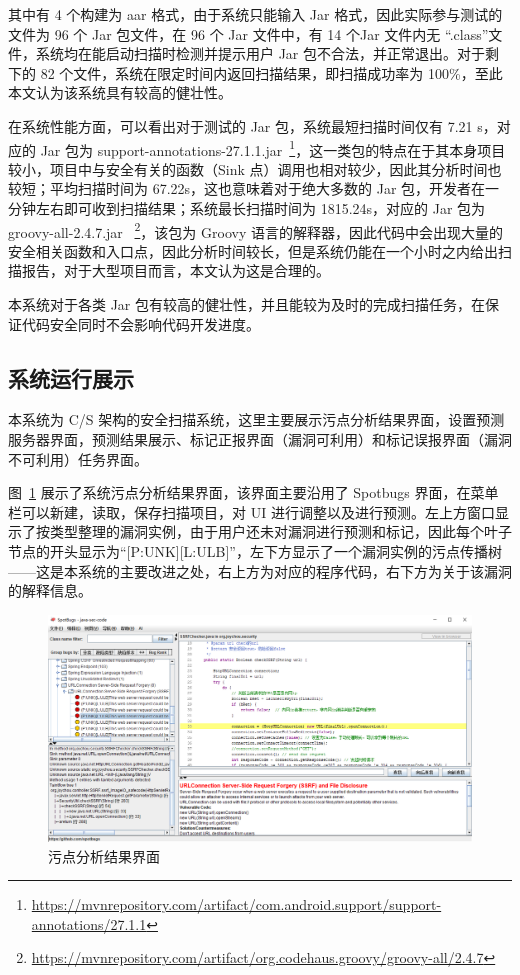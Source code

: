 其中有 4 个构建为 aar 格式，由于系统只能输入 Jar 格式，因此实际参与测试的文件为 96 个 Jar 包文件，在 96 个 Jar 文件中，有 14 个Jar 文件内无 “.class”文件，系统均在能启动扫描时检测并提示用户 Jar 包不合法，并正常退出。对于剩下的 82 个文件，系统在限定时间内返回扫描结果，即扫描成功率为 100\%，至此本文认为该系统具有较高的健壮性。

在系统性能方面，可以看出对于测试的 Jar 包，系统最短扫描时间仅有 7.21 s，对应的 Jar 包为 support-annotations-27.1.1.jar~\footnote{\url{https://mvnrepository.com/artifact/com.android.support/support-annotations/27.1.1}}，这一类包的特点在于其本身项目较小，项目中与安全有关的函数（Sink 点）调用也相对较少，因此其分析时间也较短；平均扫描时间为 67.22s，这也意味着对于绝大多数的 Jar 包，开发者在一分钟左右即可收到扫描结果；系统最长扫描时间为 1815.24s，对应的 Jar 包为 groovy-all-2.4.7.jar ~\footnote{\url{https://mvnrepository.com/artifact/org.codehaus.groovy/groovy-all/2.4.7}}，该包为 Groovy 语言的解释器，因此代码中会出现大量的安全相关函数和入口点，因此分析时间较长，但是系统仍能在一个小时之内给出扫描报告，对于大型项目而言，本文认为这是合理的。

本系统对于各类 Jar 包有较高的健壮性，并且能较为及时的完成扫描任务，在保证代码安全同时不会影响代码开发进度。\\

\subsection{系统运行展示}

本系统为 C/S 架构的安全扫描系统，这里主要展示污点分析结果界面，设置预测服务器界面，预测结果展示、标记正报界面（漏洞可利用）和标记误报界面（漏洞不可利用）任务界面。

图~\ref{show:taint} 展示了系统污点分析结果界面，该界面主要沿用了 Spotbugs 界面，在菜单栏可以新建，读取，保存扫描项目，对 UI 进行调整以及进行预测。左上方窗口显示了按类型整理的漏洞实例，由于用户还未对漏洞进行预测和标记，因此每个叶子节点的开头显示为“[P:UNK][L:ULB]”，左下方显示了一个漏洞实例的污点传播树——这是本系统的主要改进之处，右上方为对应的程序代码，右下方为关于该漏洞的解释信息。

\begin{figure}[!htbp]
    \centering
    \includegraphics[width=0.8\linewidth]{FIGs/chapter4/taintAnalysis.png}
    \caption{污点分析结果界面}\label{show:taint}
\end{figure} 

